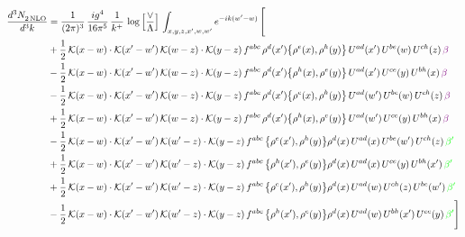 \documentclass[9pt]{article}
\numberwithin{equation}{section}
\begin{document}
\begin{align}
    \frac{d^{3}N_{2\,\rm NLO}^{\rm}}{d^{3}k}  & = \frac{1}{(2\pi)^{3}}\, \frac{ig^{4}}{16\pi^{5}}\, \frac{1}{k^{+}}\, \log{\left[\frac{\vee}{\Lambda}\right]}\, \int_{x,y,z,x^{\prime},w,w^{\prime}}e^{-ik(w^{\prime}-w)}\, \Bigg[\notag \\ & +\frac{1}{2}\,\mathcal{K}(x-w)\cdot\mathcal{K}(x'-w')\,\mathcal{K}(w-z)\cdot\mathcal{K}(y-z)\, f^{abc}\,\rho^{d}(x')\big\{\rho^{e}(x),\rho^{h}(y)\big\}\,U^{ad}(x')\,U^{be}(w)\,U^{ch}(z)\,{\color{violet} \beta}\notag\\ &-\frac{1}{2}\,\mathcal{K}(x-w)\cdot\mathcal{K}(x'-w')\,\mathcal{K}(w-z)\cdot\mathcal{K}(y-z)\, f^{abc}\,\rho^{d}(x')\big\{\rho^{h}(x),\rho^{e}(y)\big\}\,U^{ad}(x')\,U^{ce}(y)\,U^{bh}(x)\,{\color{violet} \beta}\notag\\ &-\frac{1}{2}\,\mathcal{K}(x-w)\cdot\mathcal{K}(x'-w')\,\mathcal{K}(w-z)\cdot\mathcal{K}(y-z)\, f^{abc}\,\rho^{d}(x')\big\{\rho^{e}(x),\rho^{h}(y)\big\}\,U^{ad}(w')\,U^{be}(w)\,U^{ch}(z)\,{\color{violet} \beta}\notag \\ &+\frac{1}{2}\,\mathcal{K}(x-w)\cdot\mathcal{K}(x'-w')\,\mathcal{K}(w-z)\cdot\mathcal{K}(y-z)\, f^{abc}\,\rho^{d}(x')\big\{\rho^{h}(x),\rho^{e}(y)\big\}\,U^{ad}(w')\,U^{ce}(y)\,U^{bh}(x)\,{\color{violet} \beta}\notag\\
&-\frac{1}{2}\,\mathcal{K}(x-w)\cdot\mathcal{K}(x'-w')\,\mathcal{K}(w'-z)\cdot\mathcal{K}(y-z)\, f^{abc}\,\big\{\rho^{e}(x'),\rho^{h}(y)\big\}\rho^{d}(x)\,U^{ad}(x)\,U^{be}(w')\,U^{ch}(z)\,{\color{green} \beta'}\notag \\ & +\frac{1}{2}\,\mathcal{K}(x-w)\cdot\mathcal{K}(x'-w')\,\mathcal{K}(w'-z)\cdot\mathcal{K}(y-z)\, f^{abc}\,\big\{\rho^{h}(x'),\rho^{e}(y)\big\}\rho^{d}(x)\,U^{ad}(x)\,U^{ce}(y)\,U^{bh}(x')\,{\color{green} \beta'} \notag\\ & +\frac{1}{2}\,\mathcal{K}(x-w)\cdot\mathcal{K}(x'-w')\,\mathcal{K}(w'-z)\cdot\mathcal{K}(y-z)\, f^{abc}\,\big\{\rho^{e}(x'),\rho^{h}(y)\big\}\rho^{d}(x)\,U^{ad}(w)\,U^{ch}(z)\,U^{be}(w')\,{\color{green} \beta'} \notag\\
& -\frac{1}{2}\,\mathcal{K}(x-w)\cdot\mathcal{K}(x'-w')\,\mathcal{K}(w'-z)\cdot\mathcal{K}(y-z)\, f^{abc}\,\big\{\rho^{h}(x'),\rho^{e}(y)\big\}\rho^{d}(x)\,U^{ad}(w)\,U^{bh}(x')\,U^{ce}(y)\,{\color{green} \beta'}\Bigg]
\end{align}
\end{document}
